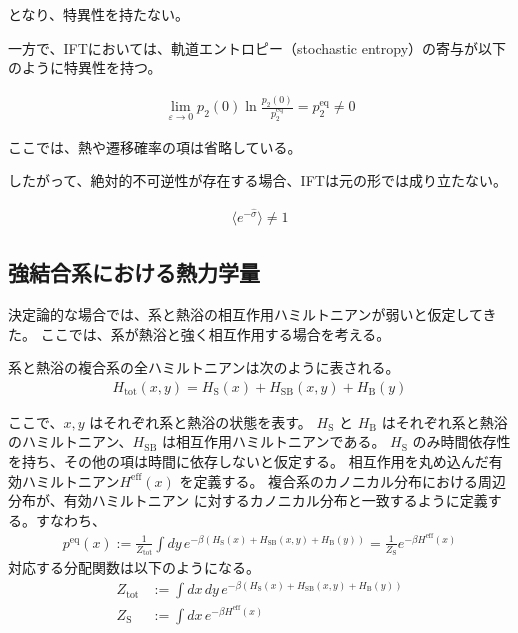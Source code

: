 \documentclass[a4paper,11pt]{jsarticle}
\numberwithin{equation}{section}
\begin{document}
となり、特異性を持たない。

一方で、IFTにおいては、軌道エントロピー（stochastic entropy）の寄与が以下のように特異性を持つ。

\begin{align}
\lim_{\varepsilon \to 0}
p_2(0) \ln \frac{p_2(0)}{p_2^{\mathrm{eq}}}
= p_2^{\mathrm{eq}} \neq 0
\end{align}

ここでは、熱や遷移確率の項は省略している。

したがって、絶対的不可逆性が存在する場合、IFTは元の形では成り立たない。

\begin{align}
\langle e^{-\hat{\sigma}} \rangle \neq 1
\end{align}

\subsection{強結合系における熱力学量}

決定論的な場合では、系と熱浴の相互作用ハミルトニアンが弱いと仮定してきた。  
ここでは、系が熱浴と強く相互作用する場合を考える。

系と熱浴の複合系の全ハミルトニアンは次のように表される。
\begin{align}
H_{\text{tot}}(x, y) = H_{\text{S}}(x) + H_{\text{SB}}(x, y) + H_{\text{B}}(y)
\end{align}

ここで、$x, y$ はそれぞれ系と熱浴の状態を表す。
$H_{\text{S}}$ と $H_{\text{B}}$ はそれぞれ系と熱浴のハミルトニアン、$H_{\text{SB}}$ は相互作用ハミルトニアンである。
$H_{\text{S}}$ のみ時間依存性を持ち、その他の項は時間に依存しないと仮定する。
相互作用を丸め込んだ有効ハミルトニアン$H^{\mathrm{eff}}(x)$ を定義する。
複合系のカノニカル分布における周辺分布が、有効ハミルトニアン に対するカノニカル分布と一致するように定義する。すなわち、
\begin{align}
p^{\mathrm{eq}}(x)
:= \frac{1}{Z_{\text{tot}}} \int dy\, e^{-\beta(H_{\text{S}}(x) + H_{\text{SB}}(x,y) + H_{\text{B}}(y))}
= \frac{1}{Z_{\text{S}}} e^{-\beta H^{\mathrm{eff}}(x)}
\end{align}
対応する分配関数は以下のようになる。
\begin{align}
Z_{\text{tot}} &:= \int dx\, dy\, e^{-\beta(H_{\text{S}}(x) + H_{\text{SB}}(x,y) + H_{\text{B}}(y))} \\
Z_{\text{S}} &:= \int dx\, e^{-\beta H^{\mathrm{eff}}(x)}
\end{align}
\end{document}
